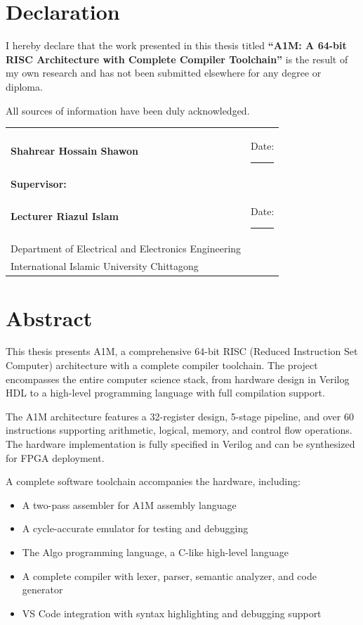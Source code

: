 \documentclass[12pt,a4paper,oneside]{book}
\begin{document}
\chapter*{Declaration}

I hereby declare that the work presented in this thesis titled \textbf{``A1M: A 64-bit RISC Architecture with Complete Compiler Toolchain''} is the result of my own research and has not been submitted elsewhere for any degree or diploma.

All sources of information have been duly acknowledged.

\vspace{2cm}

\noindent
\begin{tabular}{@{}ll}
\textbf{Shahrear Hossain Shawon} & Date: \rule{3cm}{0.4pt} \\[2cm]
\textbf{Supervisor:} & \\
\textbf{Lecturer Riazul Islam} & Date: \rule{3cm}{0.4pt} \\
Department of Electrical and Electronics Engineering & \\
International Islamic University Chittagong & \\
\end{tabular}

\chapter*{Abstract}

This thesis presents A1M, a comprehensive 64-bit RISC (Reduced Instruction Set Computer) architecture with a complete compiler toolchain. The project encompasses the entire computer science stack, from hardware design in Verilog HDL to a high-level programming language with full compilation support.

The A1M architecture features a 32-register design, 5-stage pipeline, and over 60 instructions supporting arithmetic, logical, memory, and control flow operations. The hardware implementation is fully specified in Verilog and can be synthesized for FPGA deployment.

A complete software toolchain accompanies the hardware, including:
\begin{itemize}
    \item A two-pass assembler for A1M assembly language
    \item A cycle-accurate emulator for testing and debugging
    \item The Algo programming language, a C-like high-level language
    \item A complete compiler with lexer, parser, semantic analyzer, and code generator
    \item VS Code integration with syntax highlighting and debugging support
\end{itemize}
\end{document}
